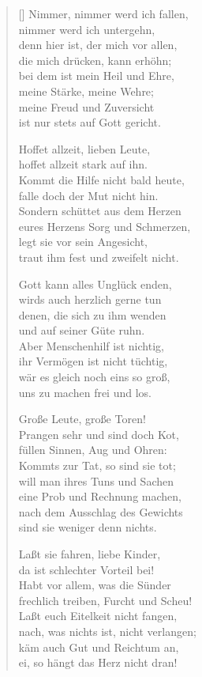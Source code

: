 \begin{multicols}{2}
\begin{verse}[\versewidth]
 Nimmer, nimmer werd ich fallen,\\
nimmer werd ich untergehn,\\
denn hier ist, der mich vor allen,\\
die mich drücken, kann erhöhn;\\
bei dem ist mein Heil und Ehre,\\
meine Stärke, meine Wehre;\\
meine Freud und Zuversicht\\
ist nur stets auf Gott gericht.

 Hoffet allzeit, lieben Leute,\\
hoffet allzeit stark auf ihn.\\
Kommt die Hilfe nicht bald heute,\\
falle doch der Mut nicht hin.\\
Sondern schüttet aus dem Herzen\\
eures Herzens Sorg und Schmerzen,\\
legt sie vor sein Angesicht,\\
traut ihm fest und zweifelt nicht.

 Gott kann alles Unglück enden,\\
wirds auch herzlich gerne tun\\
denen, die sich zu ihm wenden\\
und auf seiner Güte ruhn.\\
Aber Menschenhilf ist nichtig,\\
ihr Vermögen ist nicht tüchtig,\\
wär es gleich noch eins so groß,\\
uns zu machen frei und los.

 Große Leute, große Toren!\\
Prangen sehr und sind doch Kot,\\
füllen Sinnen, Aug und Ohren:\\
Kommts zur Tat, so sind sie tot;\\
will man ihres Tuns und Sachen\\
eine Prob und Rechnung machen,\\
nach dem Ausschlag des Gewichts\\
sind sie weniger denn nichts.

 Laßt sie fahren, liebe Kinder,\\
da ist schlechter Vorteil bei!\\
Habt vor allem, was die Sünder\\
frechlich treiben, Furcht und Scheu!\\
Laßt euch Eitelkeit nicht fangen,\\
nach, was nichts ist, nicht verlangen;\\
käm auch Gut und Reichtum an,\\
ei, so hängt das Herz nicht dran!


\end{verse}
\end{multicols}

